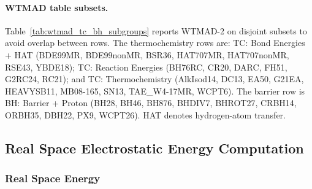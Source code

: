 \documentclass[aps,%
superscriptaddress,
 amsmath,amssymb,
floatfix,
twocolumn
]{revtex4-2}
\begin{document}
\paragraph{WTMAD table subsets.} Table~\ref{tab:wtmad_tc_bh_subgroups} reports WTMAD-2 on disjoint subsets to avoid overlap between rows. The thermochemistry rows are: TC: Bond Energies + HAT (BDE99MR, BDE99nonMR, BSR36, HAT707MR, HAT707nonMR, RSE43, YBDE18); TC: Reaction Energies (BH76RC, CR20, DARC, FH51, G2RC24, RC21); and TC: Thermochemistry (AlkIsod14, DC13, EA50, G21EA, HEAVYSB11, MB08-165, SN13, TAE\_W4-17MR, WCPT6). The barrier row is BH: Barrier + Proton (BH28, BH46, BH876, BHDIV7, BHROT27, CRBH14, ORBH35, DBH22, PX9, WCPT26). HAT denotes hydrogen-atom transfer.

\subsection{Real Space Electrostatic Energy Computation}
\label{sec:si_realspace_electrostatics}

\subsubsection{Real Space Energy}
\end{document}

